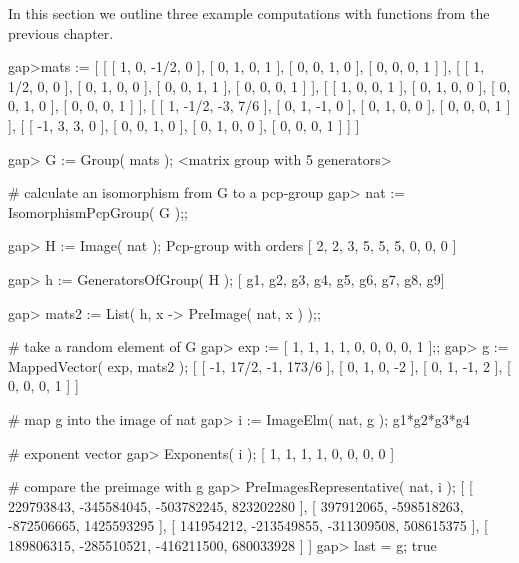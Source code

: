 
In this section we outline three example computations with functions
from the previous chapter. 


\beginexample
gap>mats := 
[ [ [ 1, 0, -1/2, 0 ], [ 0, 1, 0, 1 ], [ 0, 0, 1, 0 ], [ 0, 0, 0, 1 ] ],
  [ [ 1, 1/2, 0, 0 ], [ 0, 1, 0, 0 ], [ 0, 0, 1, 1 ], [ 0, 0, 0, 1 ] ],
  [ [ 1, 0, 0, 1 ], [ 0, 1, 0, 0 ], [ 0, 0, 1, 0 ], [ 0, 0, 0, 1 ] ],
  [ [ 1, -1/2, -3, 7/6 ], [ 0, 1, -1, 0 ], [ 0, 1, 0, 0 ], [ 0, 0, 0, 1 ] ],
  [ [ -1, 3, 3, 0 ], [ 0, 0, 1, 0 ], [ 0, 1, 0, 0 ], [ 0, 0, 0, 1 ] ] ]

gap> G := Group( mats );
<matrix group with 5 generators>

# calculate an isomorphism from G to a pcp-group
gap> nat := IsomorphismPcpGroup( G );;   
     
gap> H := Image( nat );
Pcp-group with orders [ 2, 2, 3, 5, 5, 5, 0, 0, 0 ]

gap> h := GeneratorsOfGroup( H );
[ g1, g2, g3, g4, g5, g6, g7, g8, g9]

gap> mats2 := List( h, x -> PreImage( nat, x ) );;

# take a random element of G
gap> exp :=  [ 1, 1, 1, 1, 0, 0, 0, 0, 1 ];;
gap> g := MappedVector( exp, mats2 );
[ [ -1, 17/2, -1, 173/6 ], 
  [ 0, 1, 0, -2 ], 
  [ 0, 1, -1, 2 ], 
  [ 0, 0,  0, 1 ] ]


# map g into the image of nat
gap> i := ImageElm( nat, g );
g1*g2*g3*g4

# exponent vector 
gap> Exponents( i );
[ 1, 1, 1, 1, 0, 0, 0, 0 ]

# compare the preimage with g
gap> PreImagesRepresentative( nat, i );
[ [ 229793843, -345584045, -503782245, 823202280 ],
  [ 397912065, -598518263, -872506665, 1425593295 ],
  [ 141954212, -213549855, -311309508, 508615375 ],
  [ 189806315, -285510521, -416211500, 680033928 ] ]
gap> last = g;
true

\endexample


